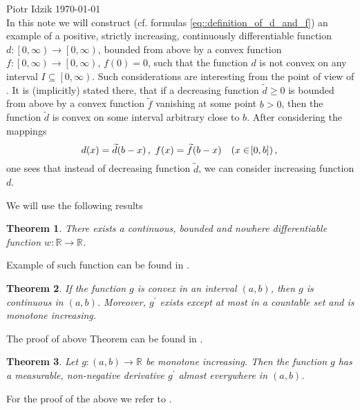 \documentclass[12pt]{article}
\newcommand{\R}{\mathbb{R}}
\renewcommand{\geq}{\geqslant}
\newcommand{\paren}[1]{\! \left( #1 \right) }
\newcommand{\bracket}[1]{\! \left[ #1 \right] }  %
\newcommand{\displaybeginfileinfo}{}
\theoremstyle{plain}
\newtheorem{theorem}{Theorem}
\theoremstyle{definition}
\theoremstyle{remark}
\begin{document}
\noindent Piotr Idzik \hfill \today \\
\displaybeginfileinfo
In this note we will construct (cf. formulas \eqref{eq::definition_of_d_and_f}) an example of a positive, strictly increasing, continuously differentiable function $d \colon \left[0, \infty \right) \to \left[0, \infty \right)$, bounded from above by a convex function $f\colon\left[0, \infty \right) \to \left[0, \infty \right)$, $f\paren{0} = 0$, such that the function $d$ is not convex on any interval $I \subseteq \left[0, \infty \right)$.
Such considerations are interesting from the point of view of \cite[p. 167]{Levandosky1998}.
It is (implicitly) stated there, that if a decreasing function $\widetilde{d} \geq 0$ is bounded from above by a convex function $\widetilde{f}$ vanishing at some point $b > 0$, then the function $\widetilde{d}$ is convex on some interval arbitrary close to $b$.
After considering the mappings
\begin{equation*}
    d\paren{x} =  \widetilde{d}\paren{b-x}, \ f\paren{x} =  \widetilde{f}\paren{b-x} \quad \paren{x \in \bracket{0, b}}, \\
\end{equation*}
one sees that instead of decreasing function $\widetilde{d}$, we can consider increasing function $d$. 

We will use the following results
\begin{theorem}
    There exists a continuous, bounded and nowhere differentiable function $w \colon \R \to \R$.
\end{theorem}
Example of such function can be found in \cite[Example 8, p. 38]{gelbaum1964counterexamples}.
 
\begin{theorem} \label{thm::convex_monotone_der}
    If the function $g$ is convex in an interval $\paren{a, b}$, then $g$ is continuous in $\paren{a, b}$.
    Moreover, $g^\prime$ exists except at most in a countable set and is monotone increasing.
\end{theorem}
The proof of above Theorem can be found in \cite[Theorem 7.40, p. 120]{wheeden1977measure}.

\begin{theorem} \label{thm::monotone_diff_ae}
    Let $g \colon \paren{a, b} \to \R$ be monotone increasing.
    Then the function $g$ has a measurable, non-negative derivative $g^\prime$ almost everywhere in $\paren{a, b}$.
\end{theorem}
For the proof of the above we refer to \cite[Theorem 7.21, page 111]{wheeden1977measure}.
\end{document}
